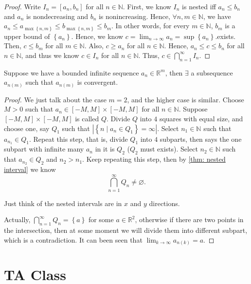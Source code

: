 \begin{proof}
    Write \(I_n = [a_n,b_n]\) for all \(n \in \mathbb{N} \). First, we know \(I_n\) is nested iff \(a_n \le b_n\) and \(a_n\) is nondecreasing and \(b_n\) is nonincreasing. Hence, \(\forall n,m \in \mathbb{N} \), we have \(a_n \le a_{\max \left\{ n,m \right\} } \le b_{\max \left\{ n,m \right\} } \le b_m\). In other words, for every \(m \in \mathbb{N} \), \(b_m\) is a upper bound of \(\left\{ a_n \right\} \). Hence, we know \(c = \lim_{n \to \infty} a_n  = \sup \left\{ a_n \right\} \).exists. Then, \(c \le b_m\) for all \(m \in \mathbb{N} \). Also, \(c \ge a_n\) for all \(n \in \mathbb{N} \). Hence, \(a_n \le c \le b_n\) for all \(n \in \mathbb{N} \), and thus we know \(c \in I_n\) for all \(n \in \mathbb{N} \). Thus, \(c \in \bigcap_{n=1}^{\infty} I_n \).                     
\end{proof}

\begin{theorem} \label{thm: Bolzano Weierstrass thm}
    Suppose we have a bounded infinite sequence \(a_n \in \mathbb{R} ^m\), then \(\exists \) a subsequence \(a_{n(m)}\) such that \(a_{n(m)}\) is convergent.   
\end{theorem}
\begin{proof}
    We just talk about the case \(m=2\), and the higher case is similar. Choose \(M>0\) such that \(a_n \in [-M,M] \times [-M,M]\) for all \(n \in \mathbb{N} \). Suppose \([-M,M] \times [-M,M]\) is called \(Q\). Divide \(Q\) into \(4\) squares with equal size, and choose one, say \(Q_1\) such that \(\left\vert \left\{ n \mid a_n \in Q_1 \right\} = \infty   \right\vert \). Select \(n_1 \in \mathbb{N} \) such that \(a_{n_1} \in Q_1\). Repeat this step, that is, divide \(Q_1\) into \(4\) subparts, then says the one subpart with infinite many \(a_n\) in it is \(Q_2\) (\(Q_2\) must exists). Select \(n_2 \in \mathbb{N} \) such that \(a_{n_2} \in Q_2\) and \(n_2 > n_1\). Keep repeating this step, then by \autoref{thm: nested interval} we know
    \[
        \bigcap_{n=1}^{\infty} Q_n \neq \varnothing.
    \] 
    \begin{note}
        Just think of the nested intervals are in \(x\) and \(y\) directions.  
    \end{note}
    Actually, \(\bigcap_{n=1}^{\infty} Q_n = \left\{ a \right\} \) for some \(a \in \mathbb{R} ^2\), otherwise if there are two points in the intersection, then at some moment we will divide them into different subpart, which is a contradiction. It can been seen that \(\lim_{k \to \infty} a_{n(k)} = a\).   
\end{proof}
\chapter{TA Class}